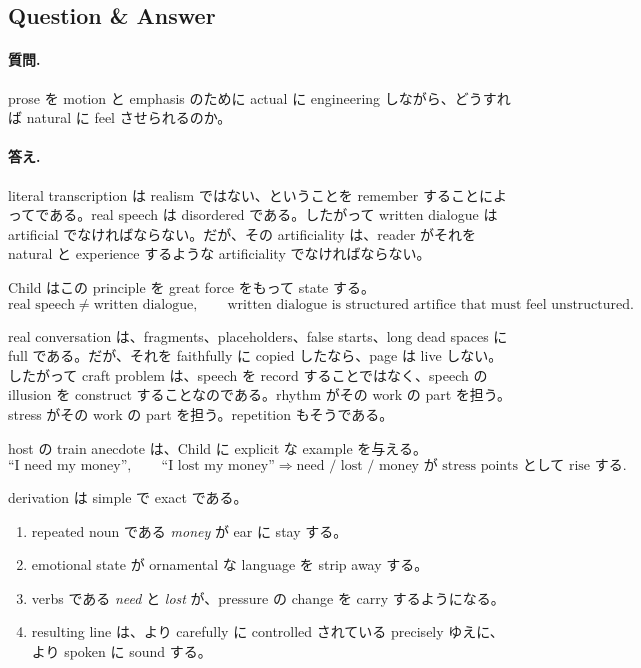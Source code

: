 \subsection{Question \& Answer}

\paragraph{質問.} prose を motion と emphasis のために actual に engineering しながら、どうすれば natural に feel させられるのか。

\paragraph{答え.} literal transcription は realism ではない、ということを remember することによってである。real speech は disordered である。したがって written dialogue は artificial でなければならない。だが、その artificiality は、reader がそれを natural と experience するような artificiality でなければならない。

Child はこの principle を great force をもって state する。
\begin{equation}
\text{real speech} \neq \text{written dialogue},
\qquad
\text{written dialogue is structured artifice that must feel unstructured}.
\end{equation}

real conversation は、fragments、placeholders、false starts、long dead spaces に full である。だが、それを faithfully に copied したなら、page は live しない。したがって craft problem は、speech を record することではなく、speech の illusion を construct することなのである。rhythm がその work の part を担う。stress がその work の part を担う。repetition もそうである。

host の train anecdote は、Child に explicit な example を与える。
\begin{equation}
\text{``I need my money''}, \qquad \text{``I lost my money''}
\Longrightarrow
\text{need / lost / money が stress points として rise する.}
\end{equation}

derivation は simple で exact である。
\begin{enumerate}
\item repeated noun である \emph{money} が ear に stay する。
\item emotional state が ornamental な language を strip away する。
\item verbs である \emph{need} と \emph{lost} が、pressure の change を carry するようになる。
\item resulting line は、より carefully に controlled されている precisely ゆえに、より spoken に sound する。
\end{enumerate}

